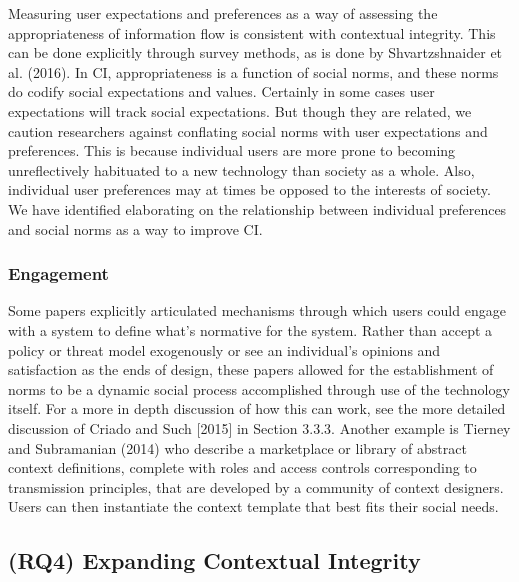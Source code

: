 \documentclass[../thesis.tex]{subfiles}
\begin{document}
Measuring user expectations and preferences as a way of assessing the
appropriateness of information flow is consistent with contextual
integrity. This can be done explicitly through survey methods, as is
done by Shvartzshnaider et al. (2016). In
CI, appropriateness is a function of social norms, and these norms do
codify social expectations and values. Certainly in some cases user
expectations will track social expectations. But though they are
related, we caution researchers against conflating social norms with
user expectations and preferences. This is because individual users are
more prone to becoming unreflectively habituated to a new technology
than society as a whole. Also, individual user preferences may at times
be opposed to the interests of society. We have identified elaborating
on the relationship between individual preferences and social norms as
a way to improve CI.


\subsubsection{Engagement}
\label{CI4.3.4}

Some papers explicitly articulated mechanisms through which users could
engage with a system to define what's normative for the
system. Rather than accept a policy or threat model exogenously or see
an individual's opinions and satisfaction as the ends
of design, these papers allowed for the establishment of norms to be a
dynamic social process accomplished through use of the technology
itself. For a more in depth discussion of how this can work, see the
more detailed discussion of Criado and Such [2015] in Section 3.3.3.
Another example is Tierney and Subramanian (2014) who describe a
marketplace or library of abstract context definitions, complete with
roles and access controls corresponding to transmission principles,
that are developed by a community of context designers. Users can then
instantiate the context template that best fits their social needs.


\subsection{(RQ4) Expanding Contextual Integrity}
\label{CI4.4}
\end{document}
